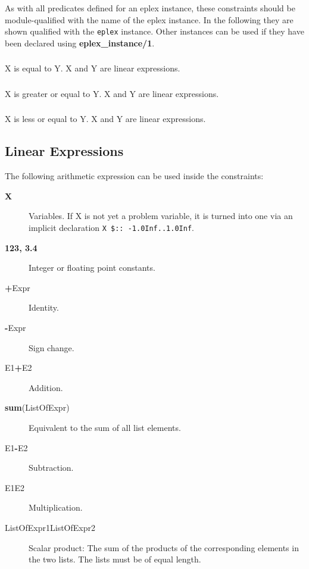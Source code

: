 As with all predicates defined for an eplex instance, these constraints
should be module-qualified with the name of the eplex instance. In the following
they are shown qualified with the {\tt eplex} instance. Other instances can
be used if they have been declared using {\bf eplex_instance/1}.
 
\subsubsection{}
X is equal to Y. X and Y are linear expressions.

\subsubsection{}
X is greater or equal to Y. X and Y are linear expressions.

\subsubsection{}
X is less or equal to Y. X and Y are linear expressions.


\subsection{Linear Expressions}

The following arithmetic expression can be used inside the constraints:
\begin{description}
\item[{\bf X}]
Variables. If X is not yet a problem variable, it is turned into one
	via an implicit declaration {\tt X\ \$::\ -1.0Inf..1.0Inf}.

\item[{\bf 123, 3.4}]
Integer or floating point constants.

\item[{\bf +}Expr]
Identity.

\item[{\bf -}Expr]
Sign change.

\item[E1{\bf +}E2]
Addition.

\item[{\bf sum}(ListOfExpr)]
Equivalent to the sum of all list elements.

\item[E1{\bf -}E2]
Subtraction.

\item[E1{\bf *}E2]
Multiplication.

\item[ListOfExpr1{\bf *}ListOfExpr2]
Scalar product: The sum of the products of the corresponding
elements in the two lists.  The lists must be of equal length.
\end{description}


